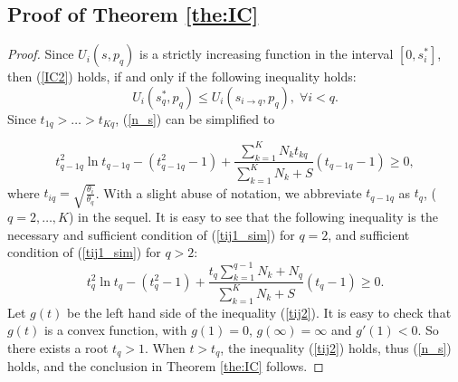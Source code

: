 \documentclass[twocolumn,10pt,twosided]{IEEEtran}
\begin{document}
\subsection{Proof of Theorem \ref{the:IC}}
\label{sub_appendix_IC}
\begin{proof}
Since $U_i(s,p_q)$ is a strictly increasing function in the interval $[0,s_i^*]$, then (\ref{IC2}) holds, if and only if the following inequality holds:
\begin{equation}
    U_i(s^*_q,p_q)\le U_i(s_{i\rightarrow q},p_q),\;\forall i<q.
\label{n_s}
\end{equation}
Since $t_{1q}>\dots>t_{Kq}$, (\ref{n_s}) can be simplified to

\begin{equation}
    t_{q-1q}^2\ln t_{q-1q}-(t_{q-1q}^2-1)+ \frac{\sum_{k=1}^{K}N_kt_{kq}}{\sum_{k=1}^{K}N_k+S}(t_{q-1q}-1)\ge 0,
\label{tij1_sim}
\end{equation}
where $t_{iq}=\sqrt{\frac{\theta_i}{\theta_q}}$. With a slight abuse of notation, we abbreviate $t_{q-1q}$ as $t_q$, ($q=2,\dots,K$) in the sequel.
It is easy to see that the following inequality is the necessary and sufficient condition of (\ref{tij1_sim}) for $q=2$, and sufficient condition of (\ref{tij1_sim}) for $q>2$:
\begin{equation}
    t_{q}^2\ln t_{q}-(t_{q}^2-1)+ \frac{t_{q}\sum_{k=1}^{q-1}N_k+N_q}{\sum_{k=1}^{K}N_k+S}(t_{q}-1)\ge 0.
\label{tij2}
\end{equation}
Let $g(t)$ be the left hand side of the inequality (\ref{tij2}). It is easy to check that $g(t)$ is a convex function, with $g(1)=0$, $g(\infty)=\infty$ and $g'(1)<0$. So there exists a root $t_q>1$. When $t>t_{q}$, the inequality (\ref{tij2}) holds, thus (\ref{n_s}) holds, and the conclusion in Theorem \ref{the:IC} follows.
\end{proof}
\end{document}

